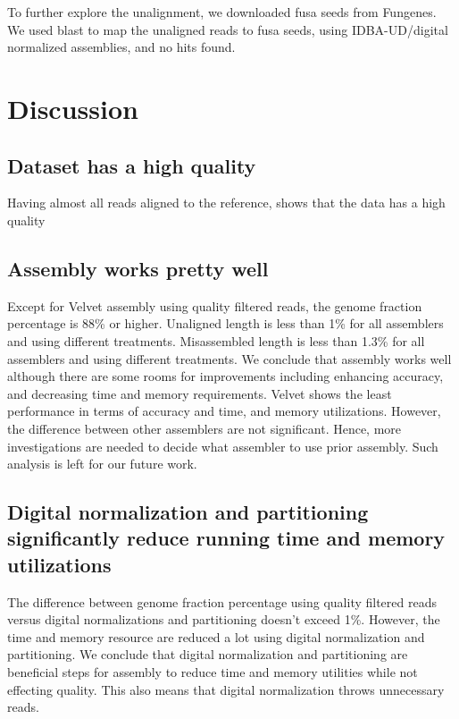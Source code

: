 To further explore the unalignment, we downloaded fusa seeds from Fungenes. We used blast to map the unaligned reads to fusa seeds,  using IDBA-UD/digital normalized  assemblies, and no hits found. 


\section*{Discussion}
 
 \subsection*{Dataset has a high quality} 
 Having almost all reads aligned to the reference, shows that the data has a high quality
 
 \subsection*{Assembly works pretty well} 
 Except for Velvet assembly using quality filtered reads, the genome fraction percentage is  88\% or higher.  Unaligned length is less than 1\% for all assemblers and using different treatments. 
 Misassembled length is less than 1.3\% for all assemblers and using different treatments. We conclude that assembly works well although there are some rooms for improvements including enhancing accuracy, and decreasing time and memory requirements. Velvet shows the least performance in terms of accuracy and time, and memory utilizations. However, the difference between other assemblers are not significant. Hence, more investigations are needed to decide what assembler to use prior assembly. Such analysis is left for our future work. 
 
 \subsection*{Digital normalization and partitioning significantly reduce running time and memory utilizations}
 
The difference between genome fraction percentage using quality filtered reads versus digital normalizations and partitioning doesn't exceed 1\%. However, the time and memory resource are reduced a lot using digital normalization and partitioning. We conclude that digital normalization and partitioning are beneficial steps for assembly to reduce time and memory utilities while not effecting quality.  This also means that digital normalization throws unnecessary reads.
 

